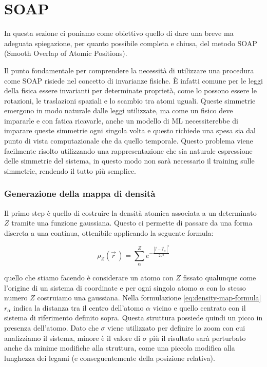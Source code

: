 

\section{SOAP}
In questa sezione ci poniamo come obiettivo quello di dare una breve ma adeguata spiegazione, per quanto possibile completa e chiusa, del metodo SOAP (Smooth Overlap of Atomic Positions). 

Il punto fondamentale per comprendere la necessità di utilizzare una procedura come SOAP risiede nel concetto di invarianze fisiche. È infatti comune per le leggi della fisica essere invarianti per determinate proprietà, come lo possono essere le rotazioni, le traslazioni spaziali e lo scambio tra atomi uguali. Queste simmetrie emergono in modo naturale dalle leggi utilizzate, ma come un fisico deve impararle e con fatica ricavarle, anche un modello di ML necessiterebbe di imparare queste simmetrie ogni singola volta e questo richiede una spesa sia dal punto di vista computazionale che da quello temporale. Questo problema viene facilmente risolto utilizzando una rappresentazione che sia naturale espressione delle simmetrie del sistema, in questo modo non sarà necessario il training sulle simmetrie, rendendo il tutto più semplice.

\subsubsection{Generazione della mappa di densità}

Il primo step è quello di costruire la densità atomica associata a un determinato $Z$ tramite una funzione gaussiana. Questo ci permette di passare da una forma discreta a una continua, ottenibile applicando la seguente formula:


\begin{equation}
    \rho_Z (\vec{r} \,) = \sum_{\alpha}^{Z} e^{-\frac{|\vec{r}-\vec{r}_{\alpha}\,|^2}{2\sigma^2}}
    \label{eq:density-map-formula}
\end{equation}

quello che stiamo facendo è considerare un atomo con $Z$ fissato qualunque come l'origine di un sistema di coordinate e per ogni singolo atomo $\alpha$ con lo stesso numero $Z$ costruiamo una gaussiana. Nella formulazione \eqref{eq:density-map-formula} $r_{\alpha}$ indica la distanza tra il centro dell'atomo $\alpha$ vicino e quello centrato con il sistema di riferimento definito sopra. Questa struttura possiede quindi un picco in presenza dell'atomo. Dato che $\sigma$ viene utilizzato per definire lo zoom con cui analizziamo il sistema, minore è il valore di $\sigma$ più il risultato sarà perturbato anche da minime modifiche alla struttura, come una piccola modifica alla lunghezza dei legami (e conseguentemente della posizione relativa).

